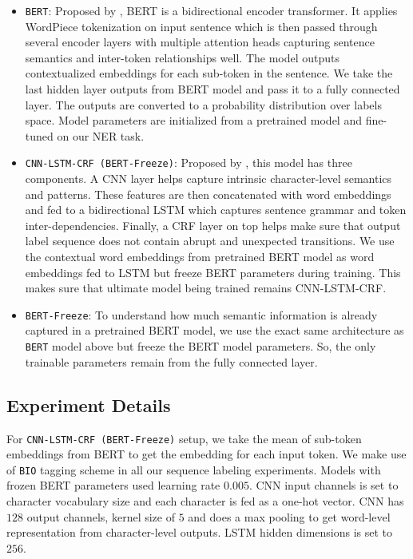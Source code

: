 \begin{itemize}

    \item \texttt{BERT}: Proposed by \cite{devlin2018bert}, BERT is a bidirectional encoder transformer\cite{vaswani2017attention}. It applies WordPiece\cite{wu2016google} tokenization on input sentence which is then passed through several encoder layers with multiple attention heads capturing sentence semantics and inter-token relationships well. The model outputs contextualized embeddings for each sub-token in the sentence. We take the last hidden layer outputs from BERT model and pass it to a fully connected layer. The outputs are converted to a probability distribution over labels space. Model parameters are initialized from a pretrained model and fine-tuned on our NER task.
    
    \item \texttt{CNN-LSTM-CRF (BERT-Freeze)}: Proposed by \cite{ma2016end}, this model has three components. A CNN layer helps capture intrinsic character-level semantics and patterns. These features are then concatenated with word embeddings and fed to a bidirectional LSTM\cite{hochreiter1997long} which captures sentence grammar and token inter-dependencies. Finally, a CRF\cite{lafferty2001conditional} layer on top helps make sure that output label sequence does not contain abrupt and unexpected transitions. We use the contextual word embeddings from pretrained BERT model as word embeddings fed to LSTM but freeze BERT parameters during training. This makes sure that ultimate model being trained remains CNN-LSTM-CRF.
    
    \item \texttt{BERT-Freeze}: To understand how much semantic information is already captured in a pretrained BERT model, we use the exact same architecture as \texttt{BERT} model above but freeze the BERT model parameters. So, the only trainable parameters remain from the fully connected layer.
\end{itemize}

\subsection{Experiment Details}
For \texttt{CNN-LSTM-CRF (BERT-Freeze)} setup, we take the mean of sub-token embeddings from BERT to get the embedding for each input token. We make use of \texttt{BIO} tagging scheme in all our sequence labeling experiments. Models with frozen BERT parameters used learning rate $0.005$. CNN input channels is set to character vocabulary size and each character is fed as a one-hot vector. CNN has $128$ output channels, kernel size of $5$ and does a max pooling to get word-level representation from character-level outputs. LSTM hidden dimensions is set to $256$.

